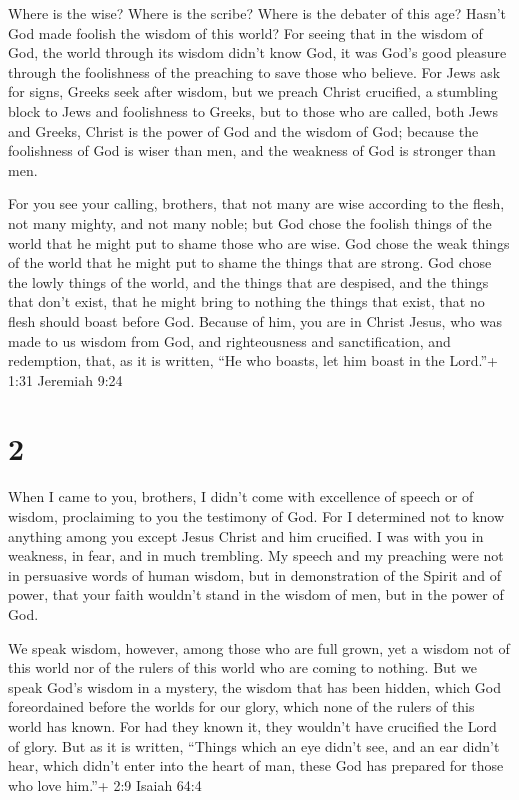  Where is the wise? Where is the scribe? Where is the
debater of this age? Hasn't God made foolish the wisdom of this world?
 For seeing that in the wisdom of God, the world through
its wisdom didn't know God, it was God's good pleasure through the
foolishness of the preaching to save those who believe. 
For Jews ask for signs, Greeks seek after wisdom,  but we
preach Christ crucified, a stumbling block to Jews and foolishness to
Greeks,  but to those who are called, both Jews and Greeks,
Christ is the power of God and the wisdom of God;  because
the foolishness of God is wiser than men, and the weakness of God is
stronger than men.

 For you see your calling, brothers, that not many are wise
according to the flesh, not many mighty, and not many noble;
 but God chose the foolish things of the world that he
might put to shame those who are wise. God chose the weak things of the
world that he might put to shame the things that are strong.
 God chose the lowly things of the world, and the things
that are despised, and the things that don't exist, that he might bring
to nothing the things that exist,  that no flesh should
boast before God.  Because of him, you are in Christ Jesus,
who was made to us wisdom from God, and righteousness and
sanctification, and redemption,  that, as it is written,
``He who boasts, let him boast in the Lord.''+ 1:31 Jeremiah 9:24

\hypertarget{section-1}{%
\section{2}\label{section-1}}

 When I came to you, brothers, I didn't come with excellence
of speech or of wisdom, proclaiming to you the testimony of God.
 For I determined not to know anything among you except
Jesus Christ and him crucified.  I was with you in weakness,
in fear, and in much trembling.  My speech and my preaching
were not in persuasive words of human wisdom, but in demonstration of
the Spirit and of power,  that your faith wouldn't stand in
the wisdom of men, but in the power of God.

 We speak wisdom, however, among those who are full grown,
yet a wisdom not of this world nor of the rulers of this world who are
coming to nothing.  But we speak God's wisdom in a mystery,
the wisdom that has been hidden, which God foreordained before the
worlds for our glory,  which none of the rulers of this
world has known. For had they known it, they wouldn't have crucified the
Lord of glory.  But as it is written, ``Things which an eye
didn't see, and an ear didn't hear, which didn't enter into the heart of
man, these God has prepared for those who love him.''+ 2:9 Isaiah 64:4

